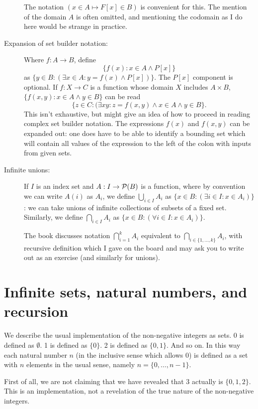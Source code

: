 \documentclass[12pt]{article}
\begin{document}
\begin{description}
The notation $(x \in A \mapsto F[x] \in B)$ is convenient for this.  The mention of the domain $A$ is often omitted, and mentioning the codomain as I do here would be strange in practice.

\item[Expansion of set builder notation:]  Where $f:A \rightarrow B$, define $$\{f(x):x \in A\wedge P[x]\}$$ as
$\{y \in B:(\exists x\in A:y=f(x) \wedge P[x])\}$.  The $P[x]$ component is optional.  If $f:X \rightarrow C$
is a function whose domain $X$ includes $A \times B$, $\{f(x,y):x \in A \wedge y \in B\}$ can be read
$$\{z \in C:(\exists xy:z=f(x,y) \wedge x \in A \wedge y \in B\}.$$ This isn't exhaustive, but might give an idea of how to proceed in reading complex set builder notation.  The expressions $f(x)$ and $f(x,y)$ can be expanded out:  one does have to be able to identify a bounding set which will contain all values of the expression to the left of the colon with inputs from given sets.

\item[Infinite unions:]  If $I$ is an index set and $A:I\rightarrow {\cal P}(B)$ is a function, where by convention we can write $A(i)$ as $A_i$, we define $\bigcup_{i \in I}A_i$ as $\{x \in B:(\exists i \in I:x \in A_i)\}$:  we can take unions of infinite collections of subsets of a fixed set.   Similarly, we define $\bigcap_{i \in I}A_i$ as $\{x \in B:(\forall i \in I:x \in A_i)\}$.

The book discusses notation $\bigcap_{i=1}^k A_i$ equivalent to $\bigcap_{i \in \{1,\ldots,k\}} A_i$, with recursive definition which I gave on the board and may ask you to write out as an exercise (and similarly for unions).

\end{description}

\section{Infinite sets, natural numbers, and recursion}

We describe the usual implementation of the non-negative integers as sets.  0 is defined as $\emptyset$.  1 is defined as $\{0\}$.  2 is defined as $\{0,1\}$.  And so on.  In this way each natural number $n$ (in the inclusive sense which allows 0) is defined as a set with $n$ elements in the usual sense, namely $n = \{0,\dots,n-1\}$.

First of all, we are not claiming that we have revealed that 3 actually is $\{0,1,2\}$.  This is an implementation, not a revelation of the true nature of the non-negative integers.
\end{document}
